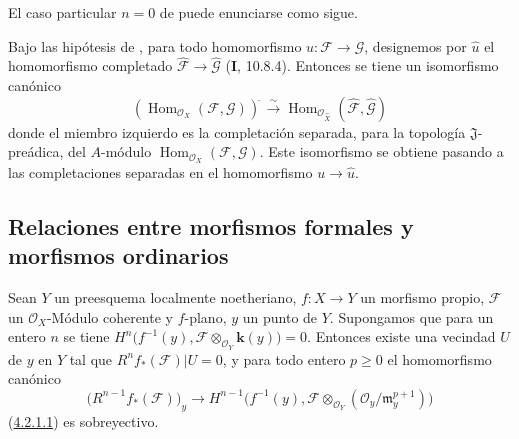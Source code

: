 El caso particular $n=0$ de  puede enunciarse como
sigue.

\begin{corollary}[4.5.3]
\label{III.4.5.3}
\label{III.4.5.3-fr}
Bajo las hipótesis de , para todo homomorfismo
$u:\mathcal F\to\mathcal G$, designemos por
$\widehat u$ el homomorfismo
completado $\widehat{\mathcal F}\to\widehat{\mathcal G}$ \textup{(\textbf{I}, 10.8.4)}. Entonces se tiene un isomorfismo canónico
\[
\label{III.4.5.3.1-fr}
\left(\operatorname{Hom}_{\mathcal O_X}(\mathcal F,\mathcal G)\right)^{\widehat{\,}}
\xrightarrow{\sim}
\operatorname{Hom}_{\mathcal O_{\widehat X}}
(\widehat{\mathcal F},\widehat{\mathcal G})
\tag{4.5.3.1}
\]
donde el miembro izquierdo es la completación separada, para la
topología $\mathfrak J$-preádica, del $A$-módulo
$\operatorname{Hom}_{\mathcal O_X}(\mathcal F,\mathcal G)$. Este isomorfismo se obtiene pasando
a las completaciones separadas en el homomorfismo
$u\to\widehat u$.
\end{corollary}


\subsection{Relaciones entre morfismos formales y morfismos ordinarios}
\label{subsection:III.4.6}

\begin{proposition}[4.6.1]
\label{III.4.6.1-fr}
Sean $Y$ un preesquema localmente noetheriano, $f:X\to Y$ un morfismo
propio, $\mathcal F$ un $\mathcal O_X$-Módulo coherente y $f$-plano, $y$ un
punto de $Y$. Supongamos que para un
entero $n$ se tiene
$H^n\bigl(f^{-1}(y),\mathcal F\otimes_{\mathcal O_Y}\boldsymbol{k}(y)\bigr)=0$.
Entonces existe una vecindad $U$ de $y$ en $Y$ tal que
$R^nf_*(\mathcal F)|U=0$, y para todo entero $p\geq0$ el homomorfismo
canónico
\[
\bigl(R^{n-1}f_*(\mathcal F)\bigr)_y
\longrightarrow
H^{n-1}\bigl(f^{-1}(y),
\mathcal F\otimes_{\mathcal O_Y}
(\mathcal O_y/\mathfrak m_y^{p+1})\bigr)
\]
\textup{(\hyperref[III.4.2.1.1-fr]{4.2.1.1})} es sobreyectivo.
\end{proposition}

